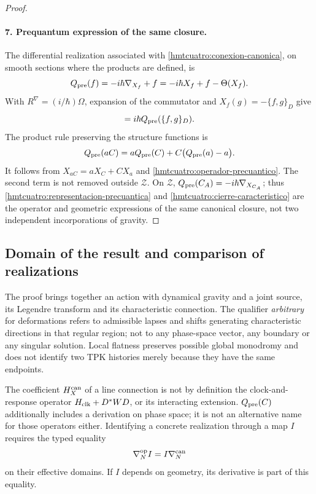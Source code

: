 \begin{proof}
\paragraph{7. Prequantum expression of the same closure.}
The differential realization associated with \eqref{hmtcuatro:conexion-canonica}, on smooth sections where the products are defined, is
\begin{equation}
 Q_{\rm pre}(f)=-i\hbar\nabla_{X_f}+f
            =-i\hbar X_f+f-\Theta(X_f).
 \label{hmtcuatro:operador-precuantico}
\end{equation}
With \(R^\nabla=(i/\hbar)\Omega\), expansion of the commutator and \(X_f(g)=-\{f,g\}_D\) give
\begin{equation}
 [Q_{\rm pre}(f),Q_{\rm pre}(g)]
           =i\hbar Q_{\rm pre}(\{f,g\}_D).
 \label{hmtcuatro:representacion-precuantica}
\end{equation}
The product rule preserving the structure functions is
\begin{equation}
 Q_{\rm pre}(aC)
   =aQ_{\rm pre}(C)+C\bigl(Q_{\rm pre}(a)-a\bigr).
 \label{hmtcuatro:funciones-estructura}
\end{equation}
It follows from \(X_{aC}=aX_C+CX_a\) and \eqref{hmtcuatro:operador-precuantico}. The second term is not removed outside \(\mathcal Z\). On \(\mathcal Z\), \(Q_{\rm pre}(C_A)=-i\hbar\nabla_{X_{C_A}}\); thus \eqref{hmtcuatro:representacion-precuantica} and \eqref{hmtcuatro:cierre-caracteristico} are the operator and geometric expressions of the same canonical closure, not two independent incorporations of gravity.
\end{proof}

\subsection{Domain of the result and comparison of realizations}
\label{hmtcuatro:alcance-canonico}

The proof brings together an action with dynamical gravity and a joint source, its Legendre transform and its characteristic connection. The qualifier \emph{arbitrary} for deformations refers to admissible lapses and shifts generating characteristic directions in that regular region; not to any phase-space vector, any boundary or any singular solution. Local flatness preserves possible global monodromy and does not identify two TPK histories merely because they have the same endpoints.

The coefficient \(H_X^{\rm can}\) of a line connection is not by definition the clock-and-response operator \(H_{\rm clk}+D^*WD\), or its interacting extension. \(Q_{\rm pre}(C)\) additionally includes a derivation on phase space; it is not an alternative name for those operators either. Identifying a concrete realization through a map \(I\) requires the typed equality
\[
 \nabla_N^{\rm op}I=I\nabla_N^{\rm can}
\]
on their effective domains. If \(I\) depends on geometry, its derivative is part of this equality.

